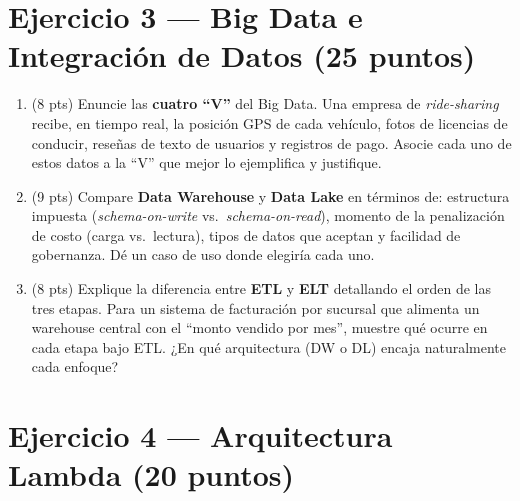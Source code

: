 \documentclass[11pt,a4paper]{article}
\begin{document}
\section*{Ejercicio 3 — Big Data e Integración de Datos \hfill\normalfont(25 puntos)}

\begin{enumerate}
  \item (8 pts) Enuncie las \textbf{cuatro ``V''} del Big Data. Una empresa de \textit{ride-sharing} recibe, en tiempo real, la posición GPS de cada vehículo, fotos de licencias de conducir, reseñas de texto de usuarios y registros de pago. Asocie cada uno de estos datos a la ``V'' que mejor lo ejemplifica y justifique.

  \vspace{4.5cm}

  \item (9 pts) Compare \textbf{Data Warehouse} y \textbf{Data Lake} en términos de: estructura impuesta (\textit{schema-on-write} vs.\ \textit{schema-on-read}), momento de la penalización de costo (carga vs.\ lectura), tipos de datos que aceptan y facilidad de gobernanza. Dé un caso de uso donde elegiría cada uno.

  \vspace{5.5cm}

  \item (8 pts) Explique la diferencia entre \textbf{ETL} y \textbf{ELT} detallando el orden de las tres etapas. Para un sistema de facturación por sucursal que alimenta un warehouse central con el ``monto vendido por mes'', muestre qué ocurre en cada etapa bajo ETL. ¿En qué arquitectura (DW o DL) encaja naturalmente cada enfoque?

  \vspace{5cm}
\end{enumerate}

\newpage

\section*{Ejercicio 4 — Arquitectura Lambda \hfill\normalfont(20 puntos)}
\end{document}
